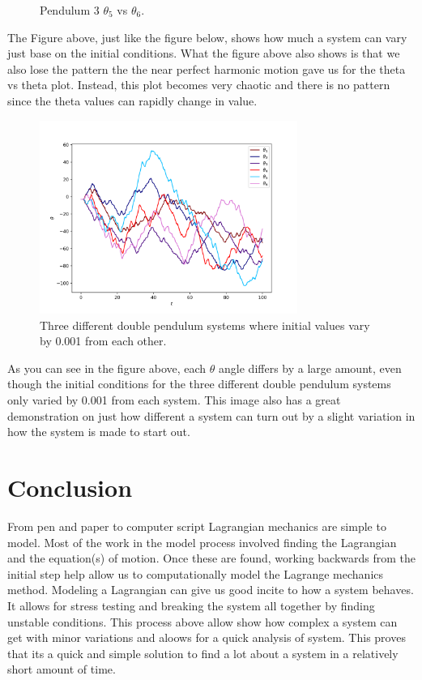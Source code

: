 \documentclass[runningheads]{llncs}
\begin{document}
\begin{figure}[!htb]
  \caption{Pendulum 3 $\theta_5$ vs $\theta_6$.}\label{fig:theta_vs_theta_3}
\endminipage
\end{figure}

The Figure above, just like the figure below, shows how much a system can vary just base on the initial conditions. What the figure above also shows is that we also lose the pattern the the near perfect harmonic motion gave us for the theta vs theta plot. Instead, this plot becomes very chaotic and there is no pattern since the theta values can rapidly change in value. 


\begin{figure}[h]
    \centering
    \includegraphics[width=0.75\textwidth]{img/compare_double_pen_1.png}
    \caption{Three different double pendulum systems where initial values vary by 0.001 from each other.}
    \label{fig:compare_theta_vs_time}
\end{figure}
 
As you can see in the figure above, each $\theta$ angle differs by a large amount, even though the initial conditions for the three different double pendulum systems only varied by 0.001 from each system. This image also has a great demonstration on just how different a system can turn out by a slight variation in how the system is made to start out.


\section{Conclusion}

From pen and paper to computer script Lagrangian mechanics are simple to model. Most of the work in the model process involved finding the Lagrangian and the equation(s) of motion. Once these are found, working backwards from the initial step help allow us to computationally model the Lagrange mechanics method. Modeling a Lagrangian can give us good incite to how a system behaves. It allows for stress testing and breaking the system all together by finding unstable conditions. This process above allow show how complex a system can get with minor variations and aloows for a quick analysis of system. This proves that its a quick and simple solution to find a lot about a system in a relatively short amount of time.
\end{document}
